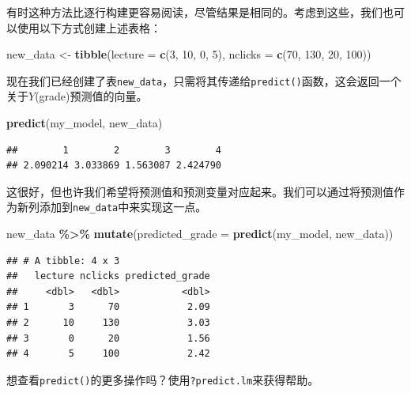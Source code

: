 \documentclass[
]{book}
\newenvironment{Shaded}{\begin{snugshade}}{\end{snugshade}}
\newcommand{\AttributeTok}[1]{\textcolor[rgb]{0.13,0.29,0.53}{#1}}
\newcommand{\DecValTok}[1]{\textcolor[rgb]{0.00,0.00,0.81}{#1}}
\newcommand{\FunctionTok}[1]{\textcolor[rgb]{0.13,0.29,0.53}{\textbf{#1}}}
\newcommand{\NormalTok}[1]{#1}
\newcommand{\OtherTok}[1]{\textcolor[rgb]{0.56,0.35,0.01}{#1}}
\newcommand{\SpecialCharTok}[1]{\textcolor[rgb]{0.81,0.36,0.00}{\textbf{#1}}}
\begin{document}
有时这种方法比逐行构建更容易阅读，尽管结果是相同的。考虑到这些，我们也可以使用以下方式创建上述表格：

\begin{Shaded}
\begin{Highlighting}[]
\NormalTok{new\_data }\OtherTok{\textless{}{-}} \FunctionTok{tibble}\NormalTok{(}\AttributeTok{lecture =} \FunctionTok{c}\NormalTok{(}\DecValTok{3}\NormalTok{, }\DecValTok{10}\NormalTok{, }\DecValTok{0}\NormalTok{, }\DecValTok{5}\NormalTok{),}
                   \AttributeTok{nclicks =} \FunctionTok{c}\NormalTok{(}\DecValTok{70}\NormalTok{, }\DecValTok{130}\NormalTok{, }\DecValTok{20}\NormalTok{, }\DecValTok{100}\NormalTok{))}
\end{Highlighting}
\end{Shaded}

现在我们已经创建了表\texttt{new\_data}，只需将其传递给\texttt{predict()}函数，这会返回一个关于\(Y\)(grade)预测值的向量。

\begin{Shaded}
\begin{Highlighting}[]
\FunctionTok{predict}\NormalTok{(my\_model, new\_data)}
\end{Highlighting}
\end{Shaded}

\begin{verbatim}
##        1        2        3        4 
## 2.090214 3.033869 1.563087 2.424790
\end{verbatim}

这很好，但也许我们希望将预测值和预测变量对应起来。我们可以通过将预测值作为新列添加到\texttt{new\_data}中来实现这一点。

\begin{Shaded}
\begin{Highlighting}[]
\NormalTok{new\_data }\SpecialCharTok{\%\textgreater{}\%}
  \FunctionTok{mutate}\NormalTok{(}\AttributeTok{predicted\_grade =} \FunctionTok{predict}\NormalTok{(my\_model, new\_data))}
\end{Highlighting}
\end{Shaded}

\begin{verbatim}
## # A tibble: 4 x 3
##   lecture nclicks predicted_grade
##     <dbl>   <dbl>           <dbl>
## 1       3      70            2.09
## 2      10     130            3.03
## 3       0      20            1.56
## 4       5     100            2.42
\end{verbatim}

想查看\texttt{predict()}的更多操作吗？使用\texttt{?predict.lm}来获得帮助。
\end{document}

